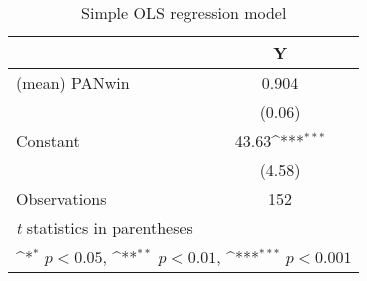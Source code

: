 \begin{table}[htbp]\centering
\def\sym#1{\ifmmode^{#1}\else\(^{#1}\)\fi}
\caption{Simple OLS regression model\label{tab:model1}}
\begin{tabular}{l*{1}{c}}
\toprule
                    &\multicolumn{1}{c}{Y}\\
\midrule
(mean) PANwin       &       0.904         \\
                    &      (0.06)         \\
\addlinespace
Constant            &       43.63\sym{***}\\
                    &      (4.58)         \\
\midrule
Observations        &         152         \\
\bottomrule
\multicolumn{2}{l}{\footnotesize \textit{t} statistics in parentheses}\\
\multicolumn{2}{l}{\footnotesize \sym{*} \(p<0.05\), \sym{**} \(p<0.01\), \sym{***} \(p<0.001\)}\\
\end{tabular}
\end{table}
